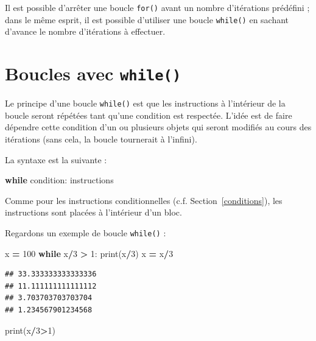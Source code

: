 \documentclass[12pt,]{book}
\newenvironment{Shaded}{\begin{snugshade}}{\end{snugshade}}
\newcommand{\DecValTok}[1]{\textcolor[rgb]{0.00,0.00,0.81}{#1}}
\newcommand{\ControlFlowTok}[1]{\textcolor[rgb]{0.13,0.29,0.53}{\textbf{#1}}}
\newcommand{\OperatorTok}[1]{\textcolor[rgb]{0.81,0.36,0.00}{\textbf{#1}}}
\newcommand{\BuiltInTok}[1]{#1}
\newcommand{\NormalTok}[1]{#1}
\numberwithin{equation}{section}
\numberwithin{countremarque}{section}
\let\BeginKnitrBlock\begin \let\EndKnitrBlock\end
\begin{document}
\BeginKnitrBlock{remarque}
Il est possible d'arrêter une boucle \texttt{for()} avant un nombre
d'itérations prédéfini ; dans le même esprit, il est possible d'utiliser
une boucle \texttt{while()} en sachant d'avance le nombre d'itérations à
effectuer.
\EndKnitrBlock{remarque}

\section{\texorpdfstring{Boucles avec
\texttt{while()}}{Boucles avec while()}}\label{boucles-avec-while}

Le principe d'une boucle \texttt{while()} est que les instructions à
l'intérieur de la boucle seront répétées tant qu'une condition est
respectée. L'idée est de faire dépendre cette condition d'un ou
plusieurs objets qui seront modifiés au cours des itérations (sans cela,
la boucle tournerait à l'infini).

La syntaxe est la suivante :

\begin{Shaded}
\begin{Highlighting}[]
\ControlFlowTok{while}\NormalTok{ condition:}
\NormalTok{  instructions}
\end{Highlighting}
\end{Shaded}

Comme pour les instructions conditionnelles (c.f.
Section~\ref{conditions}), les instructions sont placées à l'intérieur
d'un bloc.

Regardons un exemple de boucle \texttt{while()} :

\begin{Shaded}
\begin{Highlighting}[]
\NormalTok{x }\OperatorTok{=} \DecValTok{100}
\ControlFlowTok{while}\NormalTok{ x}\OperatorTok{/}\DecValTok{3} \OperatorTok{>} \DecValTok{1}\NormalTok{:}
  \BuiltInTok{print}\NormalTok{(x}\OperatorTok{/}\DecValTok{3}\NormalTok{)}
\NormalTok{  x }\OperatorTok{=}\NormalTok{ x}\OperatorTok{/}\DecValTok{3}
\end{Highlighting}
\end{Shaded}

\begin{lstlisting}
## 33.333333333333336
## 11.111111111111112
## 3.703703703703704
## 1.234567901234568
\end{lstlisting}

\begin{Shaded}
\begin{Highlighting}[]
\BuiltInTok{print}\NormalTok{(x}\OperatorTok{/}\DecValTok{3}\OperatorTok{>}\DecValTok{1}\NormalTok{)}
\end{Highlighting}
\end{Shaded}
\end{document}

